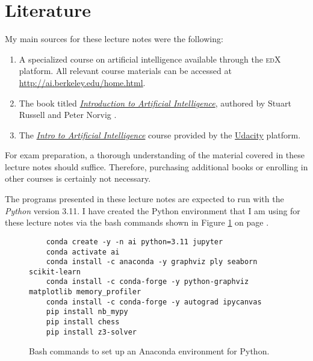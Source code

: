 \section{Literature}
My main sources for these lecture notes were the following:
\begin{enumerate}
    \item A specialized course on artificial intelligence available through the \textsc{edX} platform. All
          relevant course materials can be accessed at
          \href{http://ai.berkeley.edu/home.html}{http://ai.berkeley.edu/home.html}. 
    \item The book titled
          \href{https://www.amazon.de/Artificial-Intelligence-Modern-Approach-Global/dp/1292401133/}{\textit{Introduction to Artificial Intelligence}},
          authored by Stuart Russell and Peter Norvig \cite{russell:2020}. 
    \item The \href{https://www.udacity.com/course/intro-to-artificial-intelligence--cs271}{\textit{Intro to
          Artificial Intelligence}} course provided by the \href{https://www.udacity.com}{Udacity} platform. 
\end{enumerate}
For exam preparation, a thorough understanding of the material covered in these lecture notes should
suffice. Therefore, purchasing additional books or enrolling in other courses is certainly not necessary.

\remark
The programs presented in these lecture notes are expected to run with the \textsl{Python} version 3.11.
I have created the Python environment that I am using for these lecture notes via the bash commands shown in
Figure \ref{fig:ai.sh} on page \pageref{fig:ai.sh}.

\begin{figure}[!ht]
\centering
\begin{verbatim}
    conda create -y -n ai python=3.11 jupyter
    conda activate ai
    conda install -c anaconda -y graphviz ply seaborn scikit-learn 
    conda install -c conda-forge -y python-graphviz matplotlib memory_profiler
    conda install -c conda-forge -y autograd ipycanvas 
    pip install nb_mypy
    pip install chess 
    pip install z3-solver
\end{verbatim}
\vspace*{-0.3cm}
\caption{Bash commands to set up an Anaconda environment for Python.}
\label{fig:ai.sh}
\end{figure}



